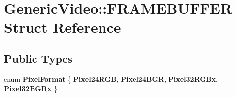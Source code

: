 \hypertarget{struct_generic_video_1_1_f_r_a_m_e_b_u_f_f_e_r}{}\section{Generic\+Video\+:\+:F\+R\+A\+M\+E\+B\+U\+F\+F\+ER Struct Reference}
\label{struct_generic_video_1_1_f_r_a_m_e_b_u_f_f_e_r}
\subsection*{Public Types}
\begin{DoxyCompactItemize}
\item 
\mbox{\label{struct_generic_video_1_1_f_r_a_m_e_b_u_f_f_e_r_a38bd8d779b5d02419d1849f009d6f158}} 
enum {\bfseries Pixel\+Format} \{ {\bfseries Pixel24\+R\+GB}, 
{\bfseries Pixel24\+B\+GR}, 
{\bfseries Pixel32\+R\+G\+Bx}, 
{\bfseries Pixel32\+B\+G\+Rx}
 \}
\end{DoxyCompactItemize}
